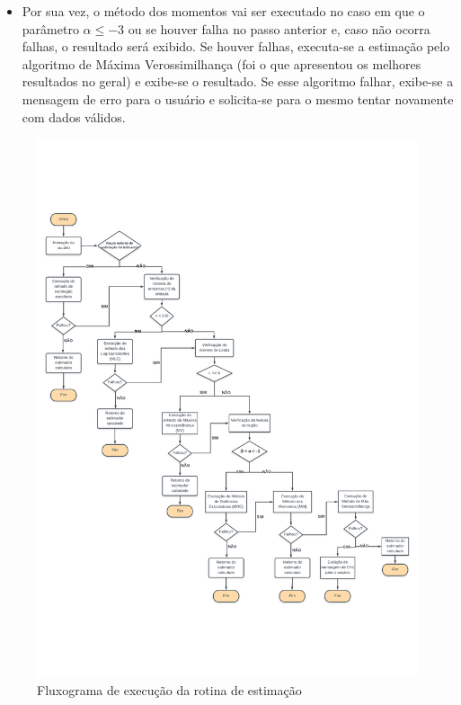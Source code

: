 \begin{itemize}
    \item Por sua vez, o método dos momentos vai ser executado no caso em que o parâmetro $\alpha \leq -3$ ou se houver falha no passo anterior e, caso não ocorra falhas, o resultado será exibido. Se houver falhas, executa-se a estimação pelo algoritmo de Máxima Verossimilhança (foi o que apresentou os melhores resultados no geral) e exibe-se o resultado. Se esse algoritmo falhar, exibe-se a mensagem de erro para o usuário e solicita-se para o mesmo tentar novamente com dados válidos.
\end{itemize}

\begin{figure}[H]
     \centering
     \includegraphics[width=\linewidth]{plots/FluxogramaDeExecucao-A4.pdf}
     \caption{Fluxograma de execução da rotina de estimação}
     \label{fig_fluxograma}
\end{figure}

